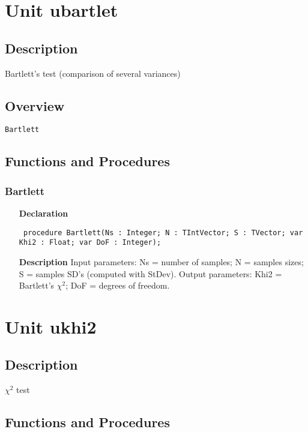 \documentclass[12pt,a4paper,oneside]{report}
\newcommand{\declarationitem}[1]{\textbf{#1}}
\newcommand{\descriptiontitle}[1]{\textbf{#1}}
\newcommand{\code}[1]{\texttt{#1}}
\begin{document}
\section{Unit ubartlet}
\label{ubartlet}
\subsection{Description}
Bartlett's test (comparison of several variances) 
\subsection{Overview}
\begin{description}
	\item[\texttt{Bartlett}]
\end{description}
\subsection{Functions and Procedures}
\subsubsection{Bartlett}
\label{ubartlet-Bartlett}
\begin{itemize}\item[\declarationitem{Declaration}\hfill]
	\begin{flushleft}
		\code{
			procedure Bartlett(Ns : Integer; N : TIntVector; S : TVector; var Khi2 : Float; var DoF : Integer);}
	\end{flushleft}
	\item[\descriptiontitle{Description}]
	Input parameters: Ns = number of samples; N = samples sizes; S = samples SD's (computed with StDev). Output parameters: Khi2 = Bartlett's $\chi^2$; DoF = degrees of freedom.
\end{itemize}


\section{Unit ukhi2}
\label{ukhi2}
\subsection{Description}
$\chi^2$ test
\subsection{Functions and Procedures}
\end{document}
